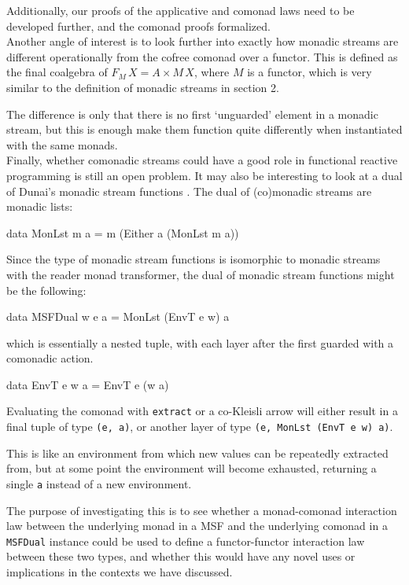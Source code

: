 Additionally, our proofs of the applicative and comonad laws need to be developed further, and the comonad proofs formalized. \\

Another angle of interest is to look further into exactly how monadic streams are different operationally from the cofree comonad over a functor. This is defined as the final coalgebra of $F_M\,X = A \times M\,X$, where $M$ is a functor, which is very similar to the definition of monadic streams in section 2.

The difference is only that there is no first `unguarded' element in a monadic stream, but this is enough make them function quite differently when instantiated with the same monads. \\

Finally, whether comonadic streams could have a good role in functional reactive programming is still an open problem. It may also be interesting to look at a dual of Dunai's monadic stream functions \cite{dunai}. The dual of (co)monadic streams are monadic lists:
\begin{haskell}
data MonLst m a = m (Either a (MonLst m a)) 
\end{haskell}
Since the type of monadic stream functions is isomorphic to monadic streams with the reader monad transformer, the dual of monadic stream functions might be the following:
\begin{haskell}
data MSFDual w e a = MonLst (EnvT e w) a
\end{haskell}
which is essentially a nested tuple, with each layer after the first guarded with a comonadic action. 

\begin{haskell}
data EnvT e w a = EnvT e (w a)
\end{haskell}

Evaluating the comonad with \verb+extract+ or a co-Kleisli arrow will either result in a final tuple of type \verb+(e, a)+, or another layer of type \verb+(e, MonLst (EnvT e w) a)+.

This is like an environment from which new values can be repeatedly extracted from, but at some point the environment will become exhausted, returning a single \verb+a+ instead of a new environment.

The purpose of investigating this is to see whether a monad-comonad interaction law \cite{uustalu:2019} between the underlying monad in a MSF and the underlying comonad in a \verb+MSFDual+ instance could be used to define a functor-functor interaction law between these two types, and whether this would have any novel uses or implications in the contexts we have discussed.
